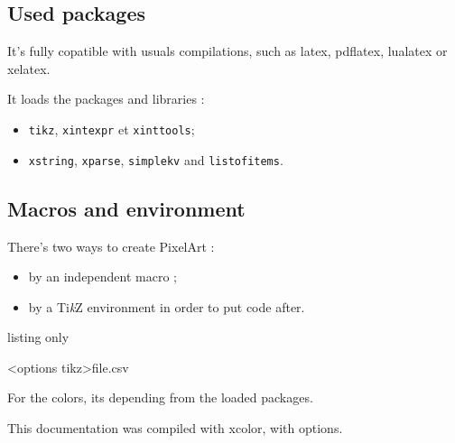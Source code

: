 \documentclass{article}
\newcommand\Cle[1]{{\bfseries\sffamily\textlangle #1\textrangle}}
\begin{document}
\subsection{Used packages}

It's fully copatible with usuals compilations, such as \textsf{latex}, \textsf{pdflatex}, \textsf{lualatex} or \textsf{xelatex}.

\medskip

It loads the packages and libraries :

\begin{itemize}
	\item \texttt{tikz}, \texttt{xintexpr} et \texttt{xinttools};
	\item \texttt{xstring}, \texttt{xparse}, \texttt{simplekv} and \texttt{listofitems}.
\end{itemize}

\pagebreak

\subsection{Macros and environment}

There's two ways to create PixelArt :

\begin{itemize}
	\item by an independent macro ;
	\item by a Ti\textit{k}Z environment in order to put code after.
\end{itemize}

\begin{PresentationCode}{listing only}


\begin{EnvPixlArtTikz}[keys]<options tikz>{file.csv}
\end{EnvPixlArtTikz}
\end{PresentationCode}

For the colors, its depending from the loaded packages.

\smallskip

This documentation was compiled with \textsf{xcolor}, with \Cle{[table,svgnames]} options.

%
\pagebreak
\end{document}
